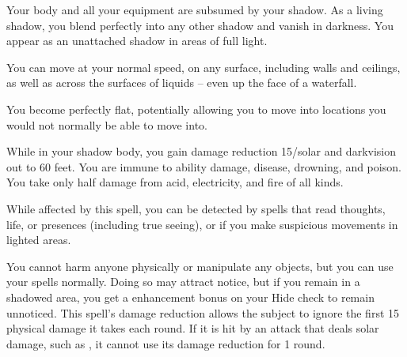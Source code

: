 \spelldur{\durmed \dismissable}
\spelleffect Your body and all your equipment are subsumed by your shadow. As a living shadow, you blend perfectly into any other shadow and vanish in darkness. You appear as an unattached shadow in areas of full light.
\par You can move at your normal speed, on any surface, including walls and ceilings, as well as across the surfaces of liquids -- even up the face of a waterfall.
\par You become perfectly flat, potentially allowing you to move into locations you would not normally be able to move into.
\par While in your shadow body, you gain damage reduction 15/solar and darkvision out to 60 feet. You are immune to ability damage, disease, drowning, and poison. You take only half damage from acid, electricity, and fire of all kinds.
\par While affected by this spell, you can be detected by spells that read thoughts, life, or presences (including true seeing), or if you make suspicious movements in lighted areas.
\par You cannot harm anyone physically or manipulate any objects, but you can use your spells normally. Doing so may attract notice, but if you remain in a shadowed area, you get a  enhancement bonus on your Hide check to remain unnoticed.
\spellnotes This spell's damage reduction allows the subject to ignore the first 15 physical damage it takes each round. If it is hit by an attack that deals solar damage, such as , it cannot use its damage reduction for 1 round.

